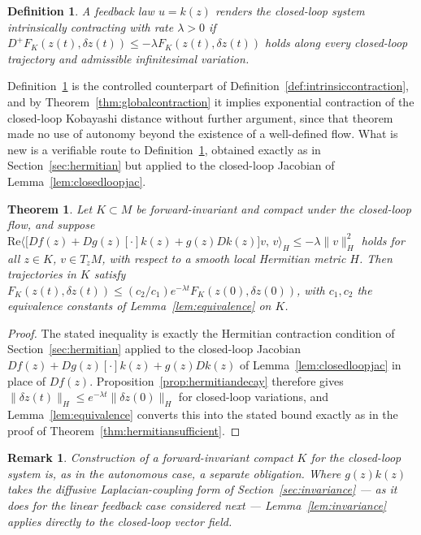 \documentclass[preprint,12pt,authoryear]{elsarticle}
\newtheorem{theorem}{Theorem}
\newtheorem{remark}{Remark}
\newtheorem{definition}{Definition}
\newtheorem{proof}{Proof}
\begin{document}
\begin{definition}
\label{def:intrinsicstab}
A feedback law $u=k(z)$ renders the closed-loop system intrinsically contracting with rate $\lambda>0$ if $D^+F_K(z(t),\delta z(t))\le-\lambda F_K(z(t),\delta z(t))$ holds along every closed-loop trajectory and admissible infinitesimal variation.
\end{definition}

Definition~\ref{def:intrinsicstab} is the controlled counterpart of Definition~\ref{def:intrinsiccontraction}, and by Theorem~\ref{thm:globalcontraction} it implies exponential contraction of the closed-loop Kobayashi distance without further argument, since that theorem made no use of autonomy beyond the existence of a well-defined flow. What is new is a verifiable route to Definition~\ref{def:intrinsicstab}, obtained exactly as in Section~\ref{sec:hermitian} but applied to the closed-loop Jacobian of Lemma~\ref{lem:closedloopjac}.

\begin{theorem}
\label{thm:closedloopsufficient}
Let $K\subset M$ be forward-invariant and compact under the closed-loop flow, and suppose $\mathrm{Re}\big\langle\big[Df(z)+Dg(z)[\cdot]k(z)+g(z)Dk(z)\big]v,\,v\big\rangle_H\le-\lambda\|v\|_H^2$ holds for all $z\in K$, $v\in T_zM$, with respect to a smooth local Hermitian metric $H$. Then trajectories in $K$ satisfy $F_K(z(t),\delta z(t))\le(c_2/c_1)e^{-\lambda t}F_K(z(0),\delta z(0))$, with $c_1,c_2$ the equivalence constants of Lemma~\ref{lem:equivalence} on $K$.
\end{theorem}

\begin{proof}
The stated inequality is exactly the Hermitian contraction condition of Section~\ref{sec:hermitian} applied to the closed-loop Jacobian $Df(z)+Dg(z)[\cdot]k(z)+g(z)Dk(z)$ of Lemma~\ref{lem:closedloopjac} in place of $Df(z)$. Proposition~\ref{prop:hermitiandecay} therefore gives $\|\delta z(t)\|_H\le e^{-\lambda t}\|\delta z(0)\|_H$ for closed-loop variations, and Lemma~\ref{lem:equivalence} converts this into the stated bound exactly as in the proof of Theorem~\ref{thm:hermitiansufficient}.
\end{proof}

\begin{remark}
Construction of a forward-invariant compact $K$ for the closed-loop system is, as in the autonomous case, a separate obligation. Where $g(z)k(z)$ takes the diffusive Laplacian-coupling form of Section~\ref{sec:invariance} — as it does for the linear feedback case considered next — Lemma~\ref{lem:invariance} applies directly to the closed-loop vector field.
\end{remark}
\end{document}
